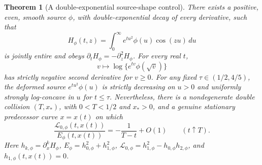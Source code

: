 \documentclass[11pt]{article}
\numberwithin{equation}{section}
\newtheorem{theorem}{Theorem}[section]
\theoremstyle{definition}
\theoremstyle{remark}
\newcommand{\dd}{\,d}
\newcommand{\Lag}{\mathcal L}
\begin{document}
\begin{theorem}[A double-exponential source-shape control]
\label{pp:smooth-collision}
There exists a positive, even, smooth source \(\phi\), with
double-exponential decay of every derivative, such that
\[
 H_\phi(t,z)=\int_0^\infty e^{tu^2}\phi(u)\cos(zu)\dd u
\]
is jointly entire and obeys \(\partial_tH_\phi=-\partial_z^2H_\phi\).
For every real \(t\),
\[
 v\longmapsto\log\{e^{tv}\phi(\sqrt v)\}
\]
has strictly negative second derivative for \(v\ge0\).
For any fixed \(\tau\in(1/2,4/5)\), the deformed source
\(e^{tu^2}\phi(u)\) is strictly decreasing on \(u>0\) and
uniformly strongly log-concave in \(u\) for \(t\le\tau\).
Nevertheless, there is a nondegenerate double collision
\((T,x_*)\), with \(0<T<1/2\) and \(x_*>0\), and a genuine
stationary predecessor curve \(x=x(t)\) on which
\begin{equation}
 \frac{\Lag_{0,\phi}(t,x(t))}{E_\phi(t,x(t))}
           =-\frac1{T-t}+O(1)\qquad(t\uparrow T).
 \label{pp:smooth-adverse-pole}
\end{equation}
Here \(h_{k,\phi}=\partial_x^kH_\phi\),
\(E_\phi=h_{0,\phi}^2+h_{1,\phi}^2\),
\(\Lag_{0,\phi}=h_{1,\phi}^2-h_{0,\phi}h_{2,\phi}\), and
\(h_{1,\phi}(t,x(t))=0\).
\end{theorem}
\end{document}

